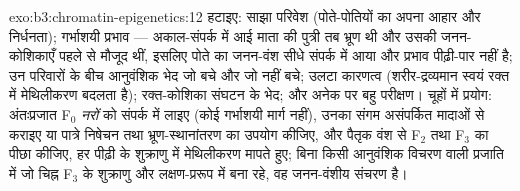 \begin{solution}{exo:b3:chromatin-epigenetics:12}
हटाइए: साझा परिवेश (पोते-पोतियों का अपना आहार और निर्धनता); गर्भाशयी
प्रभाव --- अकाल-संपर्क में आई माता की पुत्री तब भ्रूण थी और उसकी
जनन-कोशिकाएँ पहले से मौजूद थीं, इसलिए पोते का जनन-वंश सीधे संपर्क में
आया और प्रभाव पीढ़ी-पार नहीं है; उन परिवारों के बीच आनुवंशिक भेद जो बचे
और जो नहीं बचे; उलटा कारणत्व (शरीर-द्रव्यमान स्वयं रक्त में
मेथिलीकरण बदलता है); रक्त-कोशिका संघटन के भेद; और अनेक  पर बहु
परीक्षण। चूहों में प्रयोग: अंतःप्रजात F$_0$ \emph{नरों} को संपर्क में
लाइए (कोई गर्भाशयी मार्ग नहीं), उनका संगम असंपर्कित मादाओं से कराइए या
पात्रे निषेचन तथा भ्रूण-स्थानांतरण का उपयोग कीजिए, और पैतृक वंश से
F$_2$ तथा F$_3$ का पीछा कीजिए, हर पीढ़ी के शुक्राणु में मेथिलीकरण
मापते हुए; बिना किसी आनुवंशिक विचरण वाली प्रजाति में जो चिह्न F$_3$ के
शुक्राणु और लक्षण-प्ररूप में बना रहे, वह जनन-वंशीय संचरण है।
\end{solution}

